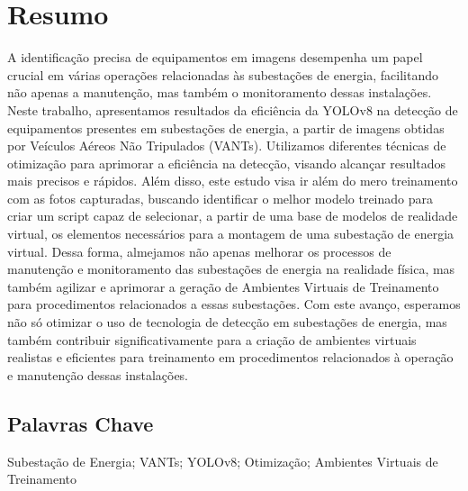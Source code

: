 \newpage
\thispagestyle{empty}
\chapter*{Resumo}
\vspace{-35pt}

A identificação precisa de equipamentos em imagens desempenha um papel crucial em várias operações relacionadas às subestações de energia, facilitando não apenas a manutenção, mas também o monitoramento dessas instalações. Neste trabalho, apresentamos resultados da eficiência da YOLOv8 na detecção de equipamentos presentes em subestações de energia, a partir de imagens obtidas por Veículos Aéreos Não Tripulados (VANTs). Utilizamos diferentes técnicas de otimização para aprimorar a eficiência na detecção, visando alcançar resultados mais precisos e rápidos. Além disso, este estudo visa ir além do mero treinamento com as fotos capturadas, buscando identificar o melhor modelo treinado para criar um script capaz de selecionar, a partir de uma base de modelos de realidade virtual, os elementos necessários para a montagem de uma subestação de energia virtual. Dessa forma, almejamos não apenas melhorar os processos de manutenção e monitoramento das subestações de energia na realidade física, mas também agilizar e aprimorar a geração de Ambientes Virtuais de Treinamento para procedimentos relacionados a essas subestações. Com este avanço, esperamos não só otimizar o uso de tecnologia de detecção em subestações de energia, mas também contribuir significativamente para a criação de ambientes virtuais realistas e eficientes para treinamento em procedimentos relacionados à operação e manutenção dessas instalações.

\section*{Palavras Chave}
Subestação de Energia; VANTs; YOLOv8; Otimização; Ambientes Virtuais de Treinamento
\newpage

